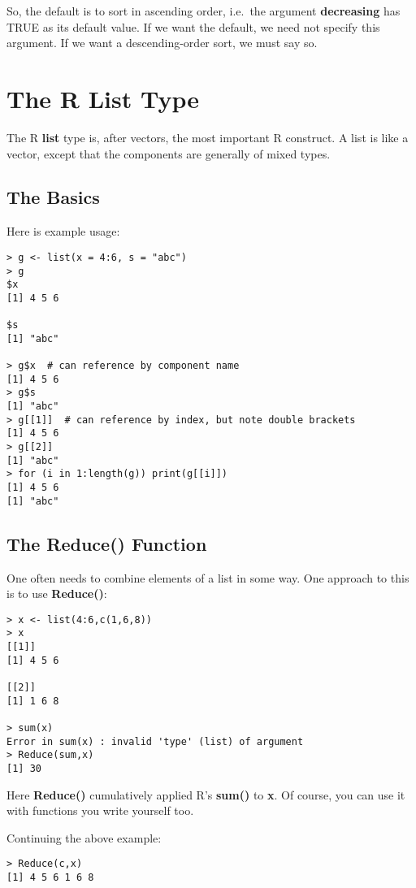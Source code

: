 So, the default is to sort in ascending order, i.e.\ the argument {\bf
decreasing} has TRUE as its default value.  If we want the default, 
we need not specify this argument.  If we want a descending-order sort,
we must say so.

\section{The R List Type}

The R {\bf list} type is, after vectors, the most important R construct.
A list is like a vector, except that the components are generally of
mixed types.

\subsection{The Basics}

Here is example usage:

\begin{lstlisting}
> g <- list(x = 4:6, s = "abc")
> g
$x
[1] 4 5 6

$s
[1] "abc"

> g$x  # can reference by component name
[1] 4 5 6
> g$s
[1] "abc"
> g[[1]]  # can reference by index, but note double brackets
[1] 4 5 6
> g[[2]]
[1] "abc"
> for (i in 1:length(g)) print(g[[i]])
[1] 4 5 6
[1] "abc"
\end{lstlisting}

\subsection{The Reduce() Function}

One often needs to combine elements of a list in some way.  One approach
to this is to use {\bf Reduce()}:

\begin{lstlisting}
> x <- list(4:6,c(1,6,8))
> x
[[1]]
[1] 4 5 6

[[2]]
[1] 1 6 8

> sum(x)
Error in sum(x) : invalid 'type' (list) of argument
> Reduce(sum,x)
[1] 30
\end{lstlisting}

Here {\bf Reduce()} cumulatively applied R's {\bf sum()} to {\bf x}.  Of
course, you can use it with functions you write yourself too.

Continuing the above example:

\begin{lstlisting}
> Reduce(c,x)  
[1] 4 5 6 1 6 8
\end{lstlisting}

